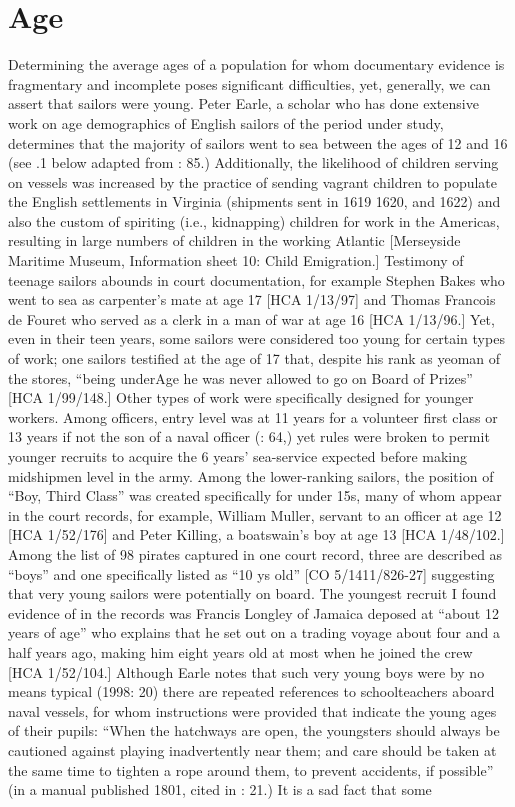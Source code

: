 \section{{Age}}%

  Determining the average ages of a population for whom documentary evidence is fragmentary and incomplete poses significant difficulties, yet, generally, we can assert that sailors were young. Peter Earle, a scholar who has done extensive work on age demographics of English sailors of the period under study, determines that the majority of sailors went to sea between the ages of 12 and 16 (see .1 below adapted from \citealt{Earle1993}: 85.) Additionally, the likelihood of children serving on vessels was increased by the practice of sending vagrant children to populate the English settlements in Virginia (shipments sent in 1619 1620, and 1622) and also the custom of spiriting (i.e., kidnapping) children for work in the Americas, resulting in large numbers of children in the working Atlantic [Merseyside Maritime Museum, Information sheet 10: Child Emigration.] Testimony of teenage sailors abounds in court documentation, for example Stephen Bakes who went to sea as carpenter’s mate at age 17 [HCA 1/13/97] and Thomas Francois de Fouret who served as a clerk in a man of war at age 16 [HCA 1/13/96.] Yet, even in their teen years, some sailors were considered too young for certain types of work; one sailors testified at the age of 17 that, despite his rank as yeoman of the stores, “being underAge he was never allowed to go on Board of Prizes” [HCA 1/99/148.] Other types of work were specifically designed for younger workers. Among officers, entry level was at 11 years for a volunteer first class or 13 years if not the son of a naval officer (\citealt{AdkinsAdkins2008}: 64,) yet rules were broken to permit younger recruits to acquire the 6 years’ sea-service expected before making midshipmen level in the army. Among the lower-ranking sailors, the position of “Boy, Third Class” was created specifically for under 15s, many of whom appear in the court records, for example, William Muller, servant to an officer at age 12 [HCA 1/52/176] and Peter Killing, a boatswain's boy at age 13 [HCA 1/48/102.] Among the list of 98 pirates captured in one court record, three are described as “boys” and one specifically listed as “10 ys old” [CO 5/1411/826-27] suggesting that very young sailors were potentially on board. The youngest recruit I found evidence of in the records was Francis Longley of Jamaica deposed at “about 12 years of age” who explains that he set out on a trading voyage about four and a half years ago, making him eight years old at most when he joined the crew [HCA 1/52/104.] Although Earle notes that such very young boys were by no means typical (1998: 20) there are repeated references to schoolteachers aboard naval vessels, for whom instructions were provided that indicate the young ages of their pupils: “When the hatchways are open, the youngsters should always be cautioned against playing inadvertently near them; and care should be taken at the same time to tighten a rope around them, to prevent accidents, if possible” (in a manual published 1801, cited in \citealt{AdkinsAdkins2008}: 21.) It is a sad fact that some 